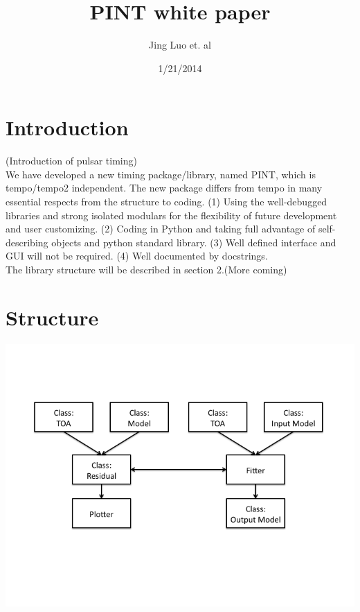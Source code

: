 \documentclass[12pt]{amsart}
\title{PINT white paper}
\author{Jing Luo et. al}
\date{1/21/2014} %
\begin{document}
\maketitle
\tableofcontents

\section{Introduction}
(Introduction of pulsar timing) \\
We have developed a new timing package/library, named PINT, which is tempo/tempo2 independent. The new package differs from tempo in many essential respects from the structure to coding. (1) Using the well-debugged libraries and strong isolated modulars for the flexibility of future development and user customizing. (2) Coding in Python and taking full advantage of self-describing objects and python standard library. (3) Well defined interface and GUI will not be required. (4) Well documented by docstrings. \\
The library structure will be described in section 2.(More coming)
\section{Structure}
\includegraphics[width=\textwidth]{PINTflow_chart.png}
\end{document}

